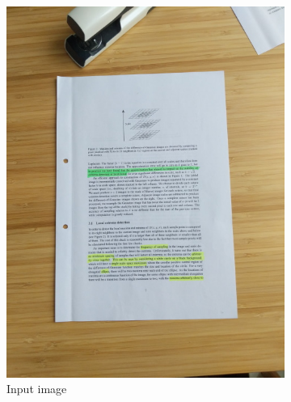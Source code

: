 \documentclass[bibliography=totoc]{scrartcl}
\begin{document}
\begin{figure}[ht!]
	\centering
	\begin{subfigure}[t]{0.3\linewidth}
		\includegraphics[width=\linewidth]{imgs/test/cluttered_desk.jpg}
		\caption{Input image}
		\label{subfig:input}
	\end{subfigure}
	\hspace{0.1\textwidth}
	\begin{subfigure}[t]{0.3\linewidth}

\end{subfigure}
\end{figure}
\end{document}
